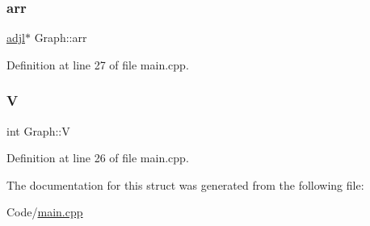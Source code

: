 \subsubsection{\texorpdfstring{arr}{arr}}
{\footnotesize\ttfamily \hyperlink{structadjl}{adjl}$\ast$ Graph\+::arr}



Definition at line 27 of file main.\+cpp.

\mbox{\label{struct_graph_a2b722f7cfa7a21e4cb5fae488b3d4dcc}} 
\subsubsection{\texorpdfstring{V}{V}}
{\footnotesize\ttfamily int Graph\+::V}



Definition at line 26 of file main.\+cpp.



The documentation for this struct was generated from the following file\+:\begin{DoxyCompactItemize}
\item 
Code/\hyperlink{main_8cpp}{main.\+cpp}\end{DoxyCompactItemize}
